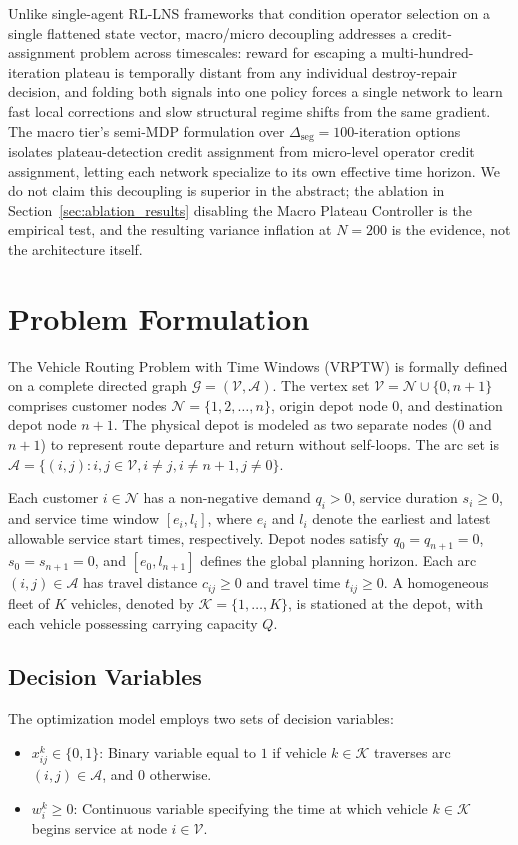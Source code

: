 \documentclass{ieeeaccess}
\begin{document}
Unlike single-agent RL-LNS frameworks that condition operator selection on a single flattened state vector, macro/micro decoupling addresses a credit-assignment problem across timescales: reward for escaping a multi-hundred-iteration plateau is temporally distant from any individual destroy-repair decision, and folding both signals into one policy forces a single network to learn fast local corrections and slow structural regime shifts from the same gradient. The macro tier's semi-MDP formulation over $\Delta_{\text{seg}}=100$-iteration options~\cite{sutton1999between} isolates plateau-detection credit assignment from micro-level operator credit assignment, letting each network specialize to its own effective time horizon. We do not claim this decoupling is superior in the abstract; the ablation in Section~\ref{sec:ablation_results} disabling the Macro Plateau Controller is the empirical test, and the resulting variance inflation at $N=200$ is the evidence, not the architecture itself.

\section{Problem Formulation}
\label{sec:formulation}

The Vehicle Routing Problem with Time Windows (VRPTW) is formally defined on a complete directed graph $\mathcal{G} = (\mathcal{V}, \mathcal{A})$. The vertex set $\mathcal{V} = \mathcal{N} \cup \{0, n+1\}$ comprises customer nodes $\mathcal{N} = \{1, 2, \dots, n\}$, origin depot node $0$, and destination depot node $n+1$. The physical depot is modeled as two separate nodes ($0$ and $n+1$) to represent route departure and return without self-loops. The arc set is $\mathcal{A} = \{(i, j) : i, j \in \mathcal{V}, i \neq j, i \neq n+1, j \neq 0\}$.

Each customer $i \in \mathcal{N}$ has a non-negative demand $q_i > 0$, service duration $s_i \ge 0$, and service time window $[e_i, l_i]$, where $e_i$ and $l_i$ denote the earliest and latest allowable service start times, respectively. Depot nodes satisfy $q_0 = q_{n+1} = 0$, $s_0 = s_{n+1} = 0$, and $[e_0, l_{n+1}]$ defines the global planning horizon. Each arc $(i, j) \in \mathcal{A}$ has travel distance $c_{ij} \ge 0$ and travel time $t_{ij} \ge 0$. A homogeneous fleet of $K$ vehicles, denoted by $\mathcal{K} = \{1, \dots, K\}$, is stationed at the depot, with each vehicle possessing carrying capacity $Q$.

\subsection{Decision Variables}
The optimization model employs two sets of decision variables:
\begin{itemize}
    \item $x_{ij}^k \in \{0, 1\}$: Binary variable equal to $1$ if vehicle $k \in \mathcal{K}$ traverses arc $(i, j) \in \mathcal{A}$, and $0$ otherwise.
    \item $w_i^k \ge 0$: Continuous variable specifying the time at which vehicle $k \in \mathcal{K}$ begins service at node $i \in \mathcal{V}$.
\end{itemize}
\end{document}
